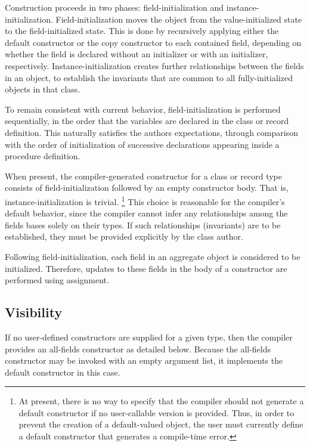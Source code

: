 Construction proceeds in two phases: field-initialization and
instance-initialization.  Field-initialization moves the object from the
value-initialized state to the field-initialized state.  This is done by
recursively applying either the default constructor or the copy constructor to
each contained field, depending on whether the field is declared without an
initializer or with an initializer, respectively.  Instance-initialization
creates further relationships between the fields in an object, to establish the
invariants that are common to all fully-initialized objects in that class.

To remain consistent with current behavior, field-initialization is performed
sequentially, in the order that the variables are declared in the class or
record definition.  This naturally satisfies the authors expectations, through
comparison with the order of initialization of successive declarations appearing
inside a procedure definition.

When present, the compiler-generated constructor for a class or record type
consists of field-initialization followed by an empty constructor body.  That
is, instance-initialization is trivial.
\footnote{At present, there is no way to specify that the compiler should not generate a
default constructor if no user-callable version is provided.  Thus, in order to
prevent the creation of a default-valued object, the user must currently define
a default constructor that generates a compile-time error.}
This choice is reasonable for the
compiler's default behavior, since the compiler cannot infer any relationships
among the fields bases solely on their types.  If such relationships
(invariants) are to be established, they must be provided explicitly by the
class author.

\begin{note}

Following field-initialization, each field in an aggregate object is considered
to be initialized.  Therefore, updates to these fields in the body of a
constructor are performed using assignment.

\end{note}

\subsection{Visibility}

If no user-defined constructors are supplied for a given type, then the compiler
provides an all-fields constructor as detailed below.  Because the all-fields
constructor may be invoked with an empty argument list, it implements the
default constructor in this case.

